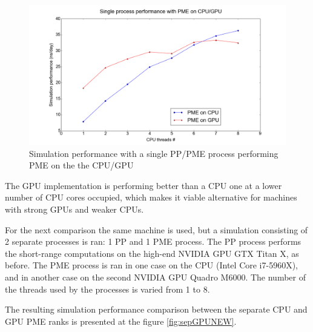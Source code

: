 \documentclass[12pt,a4paper]{report}
\begin{document}
\FloatBarrier
\begin{figure} [h!]
    \centering
    \includegraphics[width=1\textwidth]{pics/CPU_GPU_ADH_SINGLE.png}
    \caption{Simulation performance with a single PP/PME process performing PME on the the CPU/GPU}
    \label{fig:sepGPUold}
\end{figure}
\FloatBarrier

The GPU implementation is performing better than a CPU one at a lower number of CPU cores occupied, which makes it viable alternative for machines with strong GPUs and weaker CPUs. 


For the next comparison the same machine is used, but a simulation consisting of 2 separate processes is ran: 1 PP and 1 PME process. The PP process performs the short-range computations on the high-end NVIDIA GPU GTX Titan X, as before.    
The PME process is ran in one case on the CPU (Intel Core i7-5960X), and in another case on the second NVIDIA GPU Quadro M6000. The number of the threads used by the processes is varied from 1 to 8.
 
The resulting simulation performance comparison between the separate CPU and GPU PME ranks is presented at the figure \ref{fig:sepGPUNEW}.
 
\end{document}
